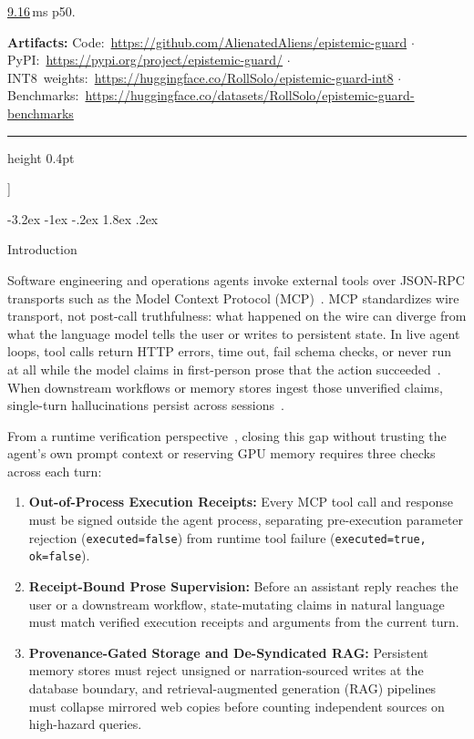 \documentclass[10pt,twocolumn]{article}
\makeatletter
\renewcommand\section{\@startsection{section}{1}{\z@}%
  {-3.2ex \@plus -1ex \@minus -.2ex}%
  {1.8ex \@plus .2ex}%
  {\normalfont\Large\bfseries\raggedright}}
\makeatother
\begin{document}
\begin{@twocolumnfalse}
\begin{center}
\begin{minipage}{0.94\textwidth}
\href{https://github.com/AlienatedAliens/epistemic-guard/blob/v0.5.2/results/table3_heldout_supervision.json\#L117}{9.16}\,ms p50.

\smallskip
{\footnotesize\raggedright
\noindent\textbf{Artifacts:}
\mbox{Code: \url{https://github.com/AlienatedAliens/epistemic-guard}} $\cdot$
\mbox{PyPI: \url{https://pypi.org/project/epistemic-guard/}} $\cdot$
\mbox{INT8 weights: \url{https://huggingface.co/RollSolo/epistemic-guard-int8}} $\cdot$
\mbox{Benchmarks: \url{https://huggingface.co/datasets/RollSolo/epistemic-guard-benchmarks}}\par}
\end{minipage}
\end{center}
\vspace{0.8em}
\hrule height 0.4pt
\vspace{1.0em}
\end{@twocolumnfalse}
]

\section{Introduction}
\label{sec:intro}

Software engineering and operations agents invoke external tools over JSON-RPC transports such as the Model Context Protocol (MCP)~\cite{mcp2025spec}. MCP standardizes wire transport, not post-call truthfulness: what happened on the wire can diverge from what the language model tells the user or writes to persistent state. In live agent loops, tool calls return HTTP errors, time out, fail schema checks, or never run at all while the model claims in first-person prose that the action succeeded~\cite{maxwell2026evasion}. When downstream workflows or memory stores ingest those unverified claims, single-turn hallucinations persist across sessions~\cite{greshake2023indirect,maxwell2026poisoning}.

From a runtime verification perspective~\cite{leucker2009brief,bartocci2018lectures}, closing this gap without trusting the agent's own prompt context or reserving GPU memory requires three checks across each turn:
\begin{enumerate}
  \item \textbf{Out-of-Process Execution Receipts:} Every MCP tool call and response must be signed outside the agent process, separating pre-execution parameter rejection (\texttt{executed=false}) from runtime tool failure (\texttt{executed=true, ok=false}).
  \item \textbf{Receipt-Bound Prose Supervision:} Before an assistant reply reaches the user or a downstream workflow, state-mutating claims in natural language must match verified execution receipts and arguments from the current turn.
  \item \textbf{Provenance-Gated Storage and De-Syndicated RAG:} Persistent memory stores must reject unsigned or narration-sourced writes at the database boundary, and retrieval-augmented generation (RAG) pipelines must collapse mirrored web copies before counting independent sources on high-hazard queries.
\end{enumerate}
\end{document}
